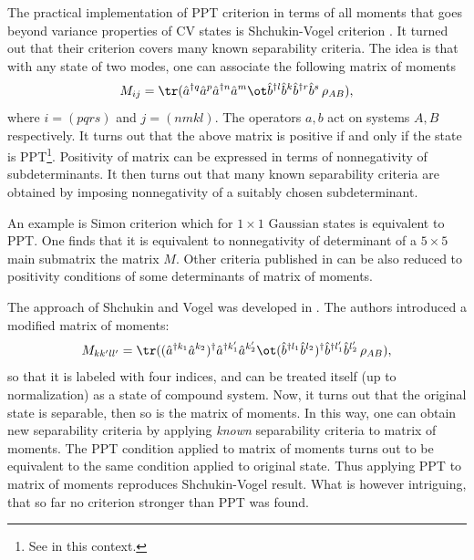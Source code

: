 \documentclass[rmp,12pt,preprint]{revtex4-2}
\begin{document}
The practical implementation of PPT criterion in terms of all moments
that goes beyond variance properties of CV states is Shchukin-Vogel
criterion \cite{SV,MiranowiczP}.  It turned out that their criterion
covers many known separability criteria.  The idea is that with any
state of two modes, one can associate the following matrix of moments
\begin{equation}
M_{ij}=\tr (\hat a^{\dagger q} \hat
a^{p}\hat a^{\dagger n} \hat a^{m} \ot \hat b^{\dagger l} \hat
b^{k}\hat b^{\dagger r} \hat b^{s}\,\rho_{AB}),
\end{equation}
where $i=(pqrs)$ and $j=(nmkl)$. The operators $a,b$ act on systems
$A,B$ respectively. It turns out that the above matrix is positive if
and only if the state is PPT\footnote{See \cite{VerchWerner} in this
  context.}. Positivity of matrix can be expressed in terms of
nonnegativity of subdeterminants. It then turns out that many known
separability criteria are obtained by imposing nonnegativity of a
suitably chosen subdeterminant.

An example is Simon criterion which for $1\times 1$ Gaussian states is
equivalent to PPT. One finds that it is equivalent to nonnegativity of
determinant of a $5\times 5$ main submatrix the matrix $M$. Other
criteria published in
\cite{DuanGCZ1999-criterion,ManciniGVT2001-criterion,RaymerFSG-cont-var,AgarwalB-cont-var,HilleryZ-cont-var}
can be also reduced to positivity conditions of some determinants of
matrix of moments.

The approach of Shchukin and Vogel was developed in
\cite{MiranowiczPHH2006-moments}. The authors introduced a modified
matrix of moments:
\begin{equation}
M_{kk'll'}=\tr ( (\hat a^{\dagger k_1} \hat
a^{k_2})^\dagger \hat a^{\dagger k_1'} \hat a^{k_2'} \ot (\hat
b^{\dagger l_1} \hat b^{l_2})^\dagger \hat b^{\dagger l_1'} \hat
b^{l_2'} \,\rho_{AB}),
\end{equation}
so that it is labeled with four indices, and can be treated itself (up
to normalization) as a state of compound system. Now, it turns out
that the original state is separable, then so is the matrix of
moments. In this way, one can obtain new separability criteria by
applying {\it known} separability criteria to matrix of moments. The
PPT condition applied to matrix of moments turns out to be equivalent
to the same condition applied to original state. Thus applying PPT to
matrix of moments reproduces Shchukin-Vogel result. What is however
intriguing, that so far no criterion stronger than PPT was found.
\end{document}
